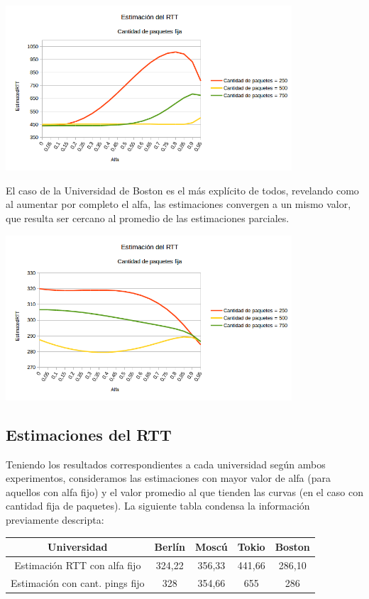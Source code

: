 \centerline{\includegraphics[width=0.8\textwidth]{imagenes/3ra_parte/ping_varios_n_fijo_variando_alfa_japon.png}}

El caso de la Universidad de Boston es el más explícito de todos, revelando como al aumentar por completo el alfa, las estimaciones convergen a un mismo valor, que resulta ser cercano al promedio de las estimaciones parciales.

\centerline{\includegraphics[width=0.8\textwidth]{imagenes/3ra_parte/ping_varios_n_fijo_variando_alfa_eeuu.png}}

\subsection{Estimaciones del RTT}

Teniendo los resultados correspondientes a cada universidad según ambos experimentos, consideramos las estimaciones con mayor valor de alfa (para aquellos con alfa fijo) y el valor promedio al que tienden las curvas (en el caso con cantidad fija de paquetes). La siguiente tabla condensa la información previamente descripta:

\begin{center}
 \begin{tabular}{|c||c|c|c|c|}
    \hline
    Universidad & Berlín & Moscú & Tokio & Boston \\ \hline \hline
    Estimación RTT con alfa fijo & 324,22 & 356,33 & 441,66 & 286,10 \\ \hline
    Estimación con cant. pings fijo & 328 & 354,66 & 655 & 286 \\ \hline
 \end{tabular}
\end{center}

